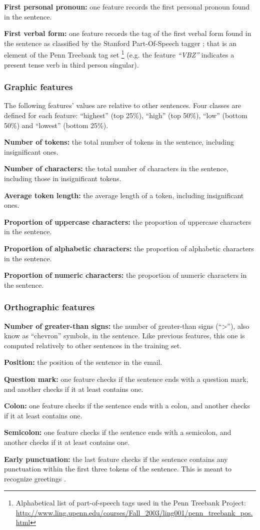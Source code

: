 \textbf{First personal pronoun:} one feature records the first personal pronoun found in the sentence.

\textbf{First verbal form:} one feature records the tag of the first verbal form found in the sentence as classified by the Stanford Part-Of-Speech tagger ; that is an element of the Penn Treebank tag set \footnote{Alphabetical list of part-of-speech tags used in the Penn Treebank Project: \url{http://www.ling.upenn.edu/courses/Fall_2003/ling001/penn_treebank_pos.html}} (e.g. the feature \textit{``VBZ''} indicates a present tense verb in third person singular).

\subsubsection{Graphic features}

The following features' values are relative to other sentences. Four classes are defined for each feature: ``highest'' (top 25\%), ``high'' (top 50\%), ``low'' (bottom 50\%) and ``lowest'' (bottom 25\%).\newline

\textbf{Number of tokens:} the total number of tokens in the sentence, including insignificant ones.

\textbf{Number of characters:} the total number of characters in the sentence, including those in insignificant tokens.

\textbf{Average token length:} the average length of a token, including insignificant ones.

\textbf{Proportion of uppercase characters:} the proportion of uppercase characters in the sentence.

\textbf{Proportion of alphabetic characters:} the proportion of alphabetic characters in the sentence.

\textbf{Proportion of numeric characters:} the proportion of numeric characters in the sentence.

\subsubsection{Orthographic features}

\textbf{Number of greater-than signs:} the number of greater-than signs (``>''), also know as ``chevron'' symbols, in the sentence. Like previous features, this one is computed relatively to other sentences in the training set.

\textbf{Position:} the position of the sentence in the email.

\textbf{Question mark:} one feature checks if the sentence ends with a question mark, and another checks if it at least contains one.

\textbf{Colon:} one feature checks if the sentence ends with a colon, and another checks if it at least contains one.

\textbf{Semicolon:} one feature checks if the sentence ends with a semicolon, and another checks if it at least contains one.

\textbf{Early punctuation:} the last feature checks if the sentence contains any punctuation within the first three tokens of the sentence. This is meant to recognize greetings \cite{qadir2011classifying}.

